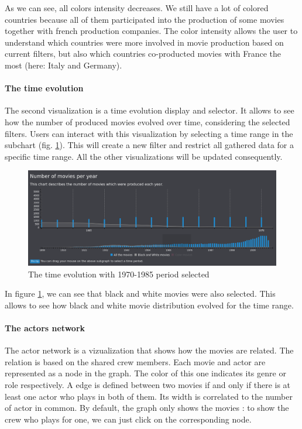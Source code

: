 \documentclass[a4paper,10pt]{article}
\begin{document}
As we can see, all colors intensity decreases. We still have a lot of colored countries
because all of them participated into the production of some movies together with
french production companies. The color intensity allows the user to understand which
countries were more involved in movie production based on current filters, but also
which countries co-producted movies with France the most (here: Italy and Germany).

\paragraph{The time evolution}

The second visualization is a time evolution display and selector. It allows to
see how the number of produced movies evolved over time, considering the selected
filters. Users can interact with this visualization by selecting a time range in the
subchart (fig. \ref{fig:time-selection}). This will create a new filter and restrict all gathered data for a specific
time range. All the other visualizations will be updated consequently.

\begin{figure}[ht]
  \centering
  \includegraphics[width=1\linewidth]{images/screens/time-selection.png}
  \caption{The time evolution with 1970-1985 period selected} \label{fig:time-selection}
\end{figure}

In figure \ref{fig:time-selection}, we can see that black and white movies were
also selected. This allows to see how black and white movie distribution evolved
for the time range.



\paragraph{The actors network}
The actor network is a vizualization that shows how the movies are related.
The relation is based on the shared crew members. Each movie and actor are represented as
a node in the graph. The color of this one indicates its genre or role respectively.
A edge is defined between two movies if and only if there is at least one actor who
plays in both of them. Its width is correlated to the number of actor in common.
By default, the graph only shows the movies : to show the crew who plays for one,
we can just click on the corresponding node.
\end{document}

